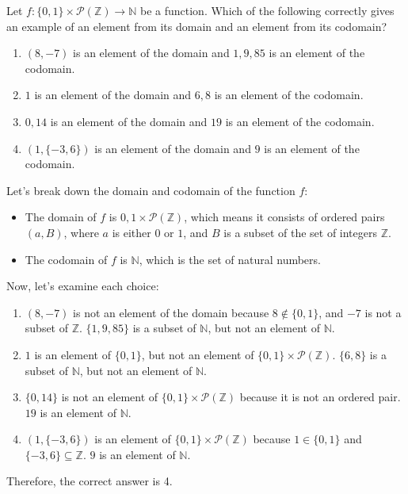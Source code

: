 \begin{exercise}
	Let $f : \{0, 1\} \times \mathcal{P}(\mathbb{Z}) \to \mathbb{N}$ be a function. Which of the following correctly gives an example of an element from its domain and an element from its codomain?
	\begin{enumerate}
		\item $(8, -7)$ is an element of the domain and ${1, 9, 85}$ is an element of the codomain.
		\item $1$ is an element of the domain and ${6, 8}$ is an element of the codomain.
		\item ${0, 14}$ is an element of the domain and $19$ is an element of the codomain.
		\item $(1, \{-3, 6\})$ is an element of the domain and $9$ is an element of the codomain.
	\end{enumerate}
\end{exercise}
\begin{solution}
	Let's break down the domain and codomain of the function $f$:
	
	\begin{itemize}
		\item The domain of $f$ is ${0, 1} \times \mathcal{P}(\mathbb{Z})$, which means it consists of ordered pairs $(a, B)$, where $a$ is either $0$ or $1$, and $B$ is a subset of the set of integers $\mathbb{Z}$.
		\item The codomain of $f$ is $\mathbb{N}$, which is the set of natural numbers.
	\end{itemize}
	
	Now, let's examine each choice:
	
	\begin{enumerate}
		\item $(8, -7)$ is not an element of the domain because $8 \notin \{0, 1\}$, and $-7$ is not a subset of $\mathbb{Z}$. $\{1, 9, 85\}$ is a subset of $\mathbb{N}$, but not an element of $\mathbb{N}$.
		\item $1$ is an element of $\{0, 1\}$, but not an element of $\{0, 1\} \times \mathcal{P}(\mathbb{Z})$. $\{6, 8\}$ is a subset of $\mathbb{N}$, but not an element of $\mathbb{N}$.
		\item $\{0, 14\}$ is not an element of $\{0, 1\} \times \mathcal{P}(\mathbb{Z})$ because it is not an ordered pair. $19$ is an element of $\mathbb{N}$.
		\item $(1, \{-3, 6\})$ is an element of $\{0, 1\} \times \mathcal{P}(\mathbb{Z})$ because $1 \in \{0, 1\}$ and $\{-3, 6\} \subseteq \mathbb{Z}$. $9$ is an element of $\mathbb{N}$.
	\end{enumerate}
	
	Therefore, the correct answer is 4.
\end{solution}

